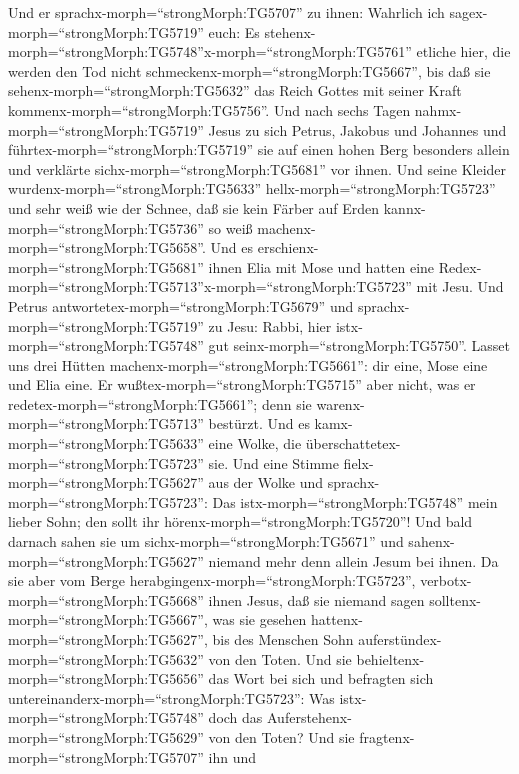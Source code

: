  Und er sprachx-morph=``strongMorph:TG5707'' zu ihnen:
Wahrlich ich sagex-morph=``strongMorph:TG5719'' euch: Es
stehenx-morph=``strongMorph:TG5748''x-morph=``strongMorph:TG5761''
etliche hier, die werden den Tod nicht
schmeckenx-morph=``strongMorph:TG5667'', bis daß sie
sehenx-morph=``strongMorph:TG5632'' das Reich Gottes mit seiner Kraft
kommenx-morph=``strongMorph:TG5756''.  Und nach sechs Tagen
nahmx-morph=``strongMorph:TG5719'' Jesus zu sich Petrus, Jakobus und
Johannes und führtex-morph=``strongMorph:TG5719'' sie auf einen hohen
Berg besonders allein und verklärte sichx-morph=``strongMorph:TG5681''
vor ihnen.  Und seine Kleider
wurdenx-morph=``strongMorph:TG5633'' hellx-morph=``strongMorph:TG5723''
und sehr weiß wie der Schnee, daß sie kein Färber auf Erden
kannx-morph=``strongMorph:TG5736'' so weiß
machenx-morph=``strongMorph:TG5658''.  Und es
erschienx-morph=``strongMorph:TG5681'' ihnen Elia mit Mose und hatten
eine Redex-morph=``strongMorph:TG5713''x-morph=``strongMorph:TG5723''
mit Jesu.  Und Petrus
antwortetex-morph=``strongMorph:TG5679'' und
sprachx-morph=``strongMorph:TG5719'' zu Jesu: Rabbi, hier
istx-morph=``strongMorph:TG5748'' gut
seinx-morph=``strongMorph:TG5750''. Lasset uns drei Hütten
machenx-morph=``strongMorph:TG5661'': dir eine, Mose eine und Elia eine.
 Er wußtex-morph=``strongMorph:TG5715'' aber nicht, was er
redetex-morph=``strongMorph:TG5661''; denn sie
warenx-morph=``strongMorph:TG5713'' bestürzt.  Und es
kamx-morph=``strongMorph:TG5633'' eine Wolke, die
überschattetex-morph=``strongMorph:TG5723'' sie. Und eine Stimme
fielx-morph=``strongMorph:TG5627'' aus der Wolke und
sprachx-morph=``strongMorph:TG5723'': Das
istx-morph=``strongMorph:TG5748'' mein lieber Sohn; den sollt ihr
hörenx-morph=``strongMorph:TG5720''!  Und bald darnach sahen
sie um sichx-morph=``strongMorph:TG5671'' und
sahenx-morph=``strongMorph:TG5627'' niemand mehr denn allein Jesum bei
ihnen.  Da sie aber vom Berge
herabgingenx-morph=``strongMorph:TG5723'',
verbotx-morph=``strongMorph:TG5668'' ihnen Jesus, daß sie niemand sagen
solltenx-morph=``strongMorph:TG5667'', was sie gesehen
hattenx-morph=``strongMorph:TG5627'', bis des Menschen Sohn
auferstündex-morph=``strongMorph:TG5632'' von den Toten. 
Und sie behieltenx-morph=``strongMorph:TG5656'' das Wort bei sich und
befragten sich untereinanderx-morph=``strongMorph:TG5723'': Was
istx-morph=``strongMorph:TG5748'' doch das
Auferstehenx-morph=``strongMorph:TG5629'' von den Toten? 
Und sie fragtenx-morph=``strongMorph:TG5707'' ihn und

